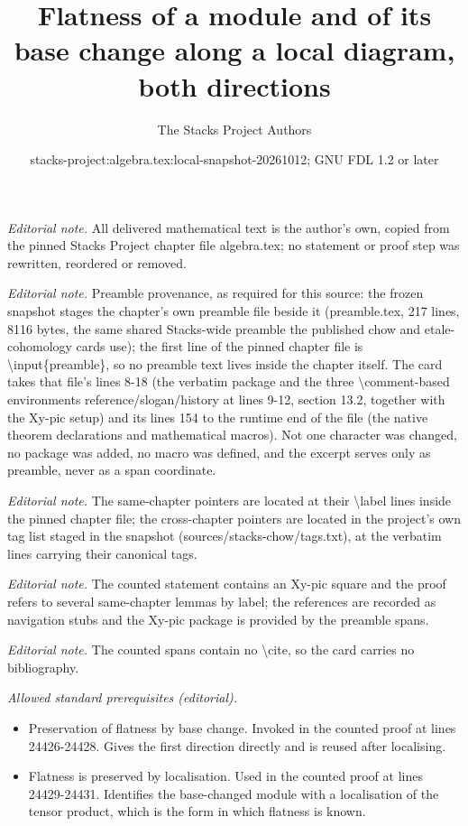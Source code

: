 \documentclass[10pt,a4paper]{amsart}
\title{Flatness of a module and of its base change along a local diagram, both directions}
\author{The Stacks Project Authors}
\date{stacks-project:algebra.tex:local-snapshot-20261012; GNU FDL 1.2 or later}
\theoremstyle{plain}
\theoremstyle{definition}
\theoremstyle{remark}
\numberwithin{equation}{subsection}
\begin{document}
\maketitle
\noindent\textit{Editorial note.} All delivered mathematical text is the author's own, copied from the pinned Stacks Project chapter file algebra.tex; no statement or proof step was rewritten, reordered or removed.\par\medskip
\noindent\textit{Editorial note.} Preamble provenance, as required for this source: the frozen snapshot stages the chapter's own preamble file beside it (preamble.tex, 217 lines, 8116 bytes, the same shared Stacks-wide preamble the published chow and etale-cohomology cards use); the first line of the pinned chapter file is \textbackslash{}input\{preamble\}, so no preamble text lives inside the chapter itself. The card takes that file's lines 8-18 (the verbatim package and the three \textbackslash{}comment-based environments reference/slogan/history at lines 9-12, section 13.2, together with the Xy-pic setup) and its lines 154 to the runtime end of the file (the native theorem declarations and mathematical macros). Not one character was changed, no package was added, no macro was defined, and the excerpt serves only as preamble, never as a span coordinate.\par\medskip
\noindent\textit{Editorial note.} The same-chapter pointers are located at their \textbackslash{}label lines inside the pinned chapter file; the cross-chapter pointers are located in the project's own tag list staged in the snapshot (sources/stacks-chow/tags.txt), at the verbatim lines carrying their canonical tags.\par\medskip
\noindent\textit{Editorial note.} The counted statement contains an Xy-pic square and the proof refers to several same-chapter lemmas by label; the references are recorded as navigation stubs and the Xy-pic package is provided by the preamble spans.\par\medskip
\noindent\textit{Editorial note.} The counted spans contain no \textbackslash{}cite, so the card carries no bibliography.\par\medskip
\noindent\textit{Allowed standard prerequisites (editorial).}\begin{itemize}
\item Preservation of flatness by base change. Invoked in the counted proof at lines 24426-24428. Gives the first direction directly and is reused after localising.
\item Flatness is preserved by localisation. Used in the counted proof at lines 24429-24431. Identifies the base-changed module with a localisation of the tensor product, which is the form in which flatness is known.
\end{itemize}\medskip
\end{document}
